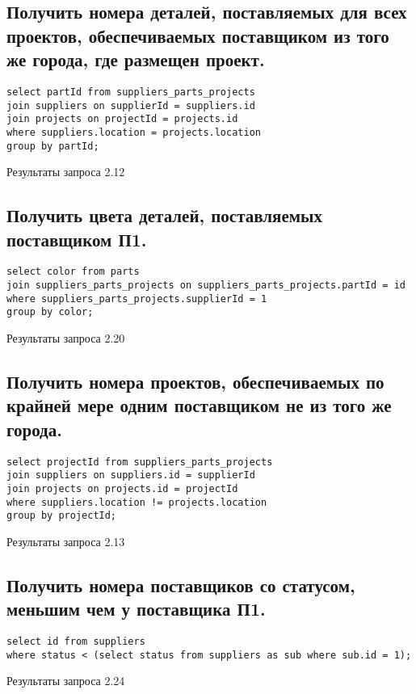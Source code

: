 \documentclass[a4paper,8pt]{article}
\begin{document}
\subsection{Получить номера деталей, поставляемых для всех проектов, обеспечиваемых поставщиком из того же города, где размещен проект.}
\begin{verbatim}
select partId from suppliers_parts_projects
join suppliers on supplierId = suppliers.id
join projects on projectId = projects.id
where suppliers.location = projects.location
group by partId;
\end{verbatim}
\begin{table}[H]
\centering

\caption{Результаты запроса 2.12}
\end{table}

\subsection{Получить цвета деталей, поставляемых поставщиком П1.}
\begin{verbatim}
select color from parts
join suppliers_parts_projects on suppliers_parts_projects.partId = id
where suppliers_parts_projects.supplierId = 1
group by color;
\end{verbatim}
\begin{table}[H]
\centering

\caption{Результаты запроса 2.20}
\end{table}

\subsection{Получить номера проектов, обеспечиваемых по крайней мере одним поставщиком не из того же города.}
\begin{verbatim}
select projectId from suppliers_parts_projects
join suppliers on suppliers.id = supplierId
join projects on projects.id = projectId
where suppliers.location != projects.location
group by projectId;
\end{verbatim}
\begin{table}[H]
\centering

\caption{Результаты запроса 2.13}
\end{table}

\subsection{Получить номера поставщиков со статусом, меньшим чем у поставщика П1.}
\begin{verbatim}
select id from suppliers
where status < (select status from suppliers as sub where sub.id = 1);
\end{verbatim}
\begin{table}[H]
\centering

\caption{Результаты запроса 2.24}
\end{table}
\end{document}
